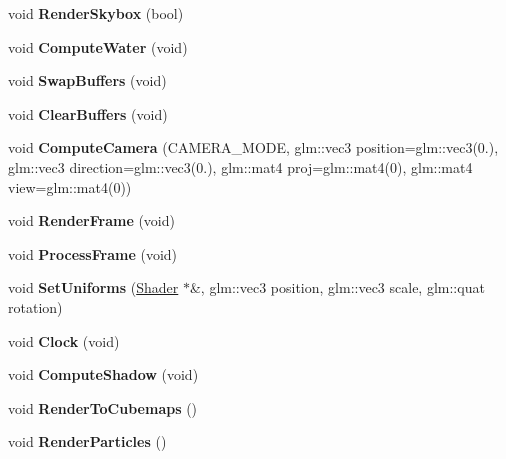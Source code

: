 \begin{DoxyCompactItemize}
\item 
void {\bfseries Render\+Skybox} (bool)\hypertarget{class_epsilon_aeb718827e14df8f618e362907c17f4be}{}\label{class_epsilon_aeb718827e14df8f618e362907c17f4be}

\item 
void {\bfseries Compute\+Water} (void)\hypertarget{class_epsilon_abbabb1ab313440119a0ff1741d52d4ca}{}\label{class_epsilon_abbabb1ab313440119a0ff1741d52d4ca}

\item 
void {\bfseries Swap\+Buffers} (void)\hypertarget{class_epsilon_a5e75d17eb31e4a826234b5611d2f710b}{}\label{class_epsilon_a5e75d17eb31e4a826234b5611d2f710b}

\item 
void {\bfseries Clear\+Buffers} (void)\hypertarget{class_epsilon_ac8ff48133df501675ef699c2e30d6c9c}{}\label{class_epsilon_ac8ff48133df501675ef699c2e30d6c9c}

\item 
void {\bfseries Compute\+Camera} (C\+A\+M\+E\+R\+A\+\_\+\+M\+O\+DE, glm\+::vec3 position=glm\+::vec3(0.), glm\+::vec3 direction=glm\+::vec3(0.), glm\+::mat4 proj=glm\+::mat4(0), glm\+::mat4 view=glm\+::mat4(0))\hypertarget{class_epsilon_a582383193c6b56f2ece5ba4e97bec2ca}{}\label{class_epsilon_a582383193c6b56f2ece5ba4e97bec2ca}

\item 
void {\bfseries Render\+Frame} (void)\hypertarget{class_epsilon_aec23d0bc6e70751880b20aa312e0e254}{}\label{class_epsilon_aec23d0bc6e70751880b20aa312e0e254}

\item 
void {\bfseries Process\+Frame} (void)\hypertarget{class_epsilon_a15d8da6ef70aabd9b8c13919bdf61bb2}{}\label{class_epsilon_a15d8da6ef70aabd9b8c13919bdf61bb2}

\item 
void {\bfseries Set\+Uniforms} (\hyperlink{class_shader}{Shader} $\ast$\&, glm\+::vec3 position, glm\+::vec3 scale, glm\+::quat rotation)\hypertarget{class_epsilon_ab7df71b81feb2a69c433d621c3b707c3}{}\label{class_epsilon_ab7df71b81feb2a69c433d621c3b707c3}

\item 
void {\bfseries Clock} (void)\hypertarget{class_epsilon_a485abd60922d9c5d1aabee3386b55266}{}\label{class_epsilon_a485abd60922d9c5d1aabee3386b55266}

\item 
void {\bfseries Compute\+Shadow} (void)\hypertarget{class_epsilon_a6b985dc929718148dc54490e34dbf21f}{}\label{class_epsilon_a6b985dc929718148dc54490e34dbf21f}

\item 
void {\bfseries Render\+To\+Cubemaps} ()\hypertarget{class_epsilon_ac696918509d18b87f1610cc5b4765418}{}\label{class_epsilon_ac696918509d18b87f1610cc5b4765418}

\item 
void {\bfseries Render\+Particles} ()\hypertarget{class_epsilon_acfb308b991cd8ffa1767b8244ecf88a1}{}\label{class_epsilon_acfb308b991cd8ffa1767b8244ecf88a1}

\end{DoxyCompactItemize}
